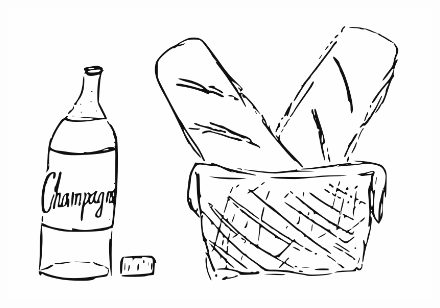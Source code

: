 \sclearpage
\begin{figure}[!b]
\begin{center}
\includegraphics[scale=0.5]{../bilder/batongochvin.png} 
\end{center}
\end{figure}

